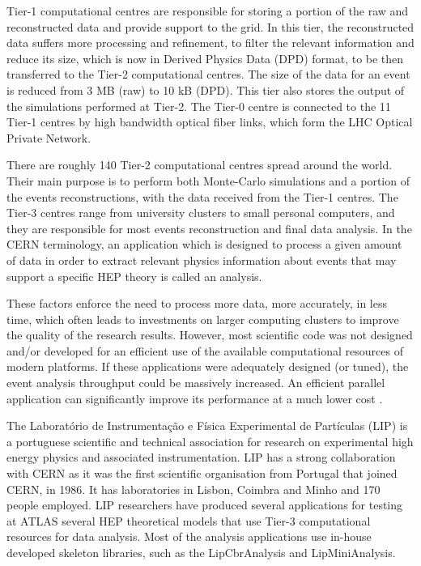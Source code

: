 Tier-1 computational centres are responsible for storing a portion of the raw and reconstructed data and provide support to the grid. In this tier, the reconstructed data suffers more processing and refinement, to filter the relevant information and reduce its size, which is now in Derived Physics Data (DPD) format, to be then transferred to the Tier-2 computational centres. The size of the data for an event is reduced from 3 MB (raw) to 10 kB (DPD). This tier also stores the output of the simulations performed at Tier-2. The Tier-0 centre is connected to the 11 Tier-1 centres by high bandwidth optical fiber links, which form the LHC Optical Private Network.

There are roughly 140 Tier-2 computational centres spread around the world. Their main purpose is to perform both Monte-Carlo simulations and a portion of the events reconstructions, with the data received from the Tier-1 centres. The Tier-3 centres range from university clusters to small personal computers, and they are responsible for most events reconstruction and final data analysis. In the CERN terminology, an application which is designed to process a given amount of data in order to extract relevant physics information about events that may support a specific HEP theory is called an analysis.

These factors enforce the need to process more data, more accurately, in less time, which often leads to investments on larger computing clusters to improve the quality of the research results. However, most scientific code was not designed and/or developed for an efficient use of the available computational resources of modern platforms. If these applications were adequately designed (or tuned), the event analysis throughput could be massively increased. An efficient parallel application can significantly improve its performance at a much lower cost \cite{Msc:AMP}.

The Laboratório de Instrumentação e Física Experimental de Partículas (LIP) \cite{LIP} is a portuguese scientific and technical association for research on experimental high energy physics and associated instrumentation. LIP has a strong collaboration with CERN as it was the first scientific organisation from Portugal that joined CERN, in 1986. It has laboratories in Lisbon, Coimbra and Minho and 170 people employed. LIP researchers have produced several applications for testing at ATLAS several HEP theoretical models that use Tier-3 computational resources for data analysis. Most of the analysis applications use in-house developed skeleton libraries, such as the LipCbrAnalysis and LipMiniAnalysis.

